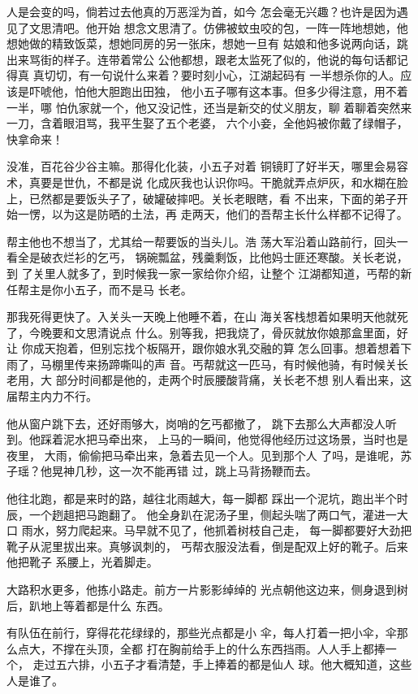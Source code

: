 人是会变的吗，倘若过去他真的万恶淫为首，如今
怎会毫无兴趣？也许是因为遇见了文思清吧。他开始
想念文思清了。仿佛被蚊虫咬的包，一阵一阵地想她，他
想她做的精致饭菜，想她同房的另一张床，想她一旦有
姑娘和他多说两向话，跳出来骂街的样子。连带着常公
公他都想，跟老太监死了似的，他说的每句话都记得真
真切切，有一句说什么来着？要时刻小心，江湖起码有
一半想杀你的人。应该是吓唬他，怕他大胆跑出田独，
他小五子哪有这本事。但多少得注意，用不着一半，哪
怕仇家就一个，他又没记性，还当是新交的仗义朋友，聊
着聊着突然来一刀，含着眼泪骂，我平生娶了五个老婆，
六个小妾，全他妈被你戴了绿帽子，快拿命来！

没准，百花谷少谷主嘛。那得化化装，小五子对着
铜镜盯了好半天，哪里会易容术，真要是世仇，不都是说
化成灰我也认识你吗。干脆就弄点炉灰，和水糊在脸
上，已然都是要饭头子了，破罐破摔吧。关长老眼瞎，看
不出来，下面的弟子开始一愣，以为这是防晒的土法，再
走两天，他们的吾帮主长什么样都不记得了。

帮主他也不想当了，尤其给一帮要饭的当头儿。浩
荡大军沿着山路前行，回头一看全是破衣烂衫的乞丐，
锅碗瓢盆，残羹剩饭，比他妈士匪还寒酸。关长老说，到
了关里人就多了，到时候我一家一家给你介绍，让整个
江湖都知道，丐帮的新任帮主是你小五子，而不是马
长老。

那我死得更快了。入关头一天晚上他睡不着，在山
海关客栈想着如果明天他就死了，今晚要和文思清说点
什么。别等我，把我烧了，骨灰就放你娘那盒里面，好让
你成天抱着，但别忘找个板隔开，跟你娘水乳交融的算
怎么回事。想着想着下雨了，马棚里传来扬蹄嘶叫的声
音。丐帮就这一匹马，有时候他骑，有时候关长老用，大
部分时间都是他的，走两个时辰腰酸背痛，关长老不想
别人看出来，这届帮主内力不行。

他从窗户跳下去，还好雨够大，岗哨的乞丐都撤了，
跳下去那么大声都没人听到。他踩着泥水把马牵出來，
上马的一瞬间，他觉得他经历过这场景，当时也是夜里，
大雨，偷偷把马牵出来，急着去见一个人。见到那个人
了吗，是谁呢，苏子瑶？他晃神几秒，这一次不能再错
过，跳上马背扬鞭而去。

他往北跑，都是来时的路，越往北雨越大，每一脚都
踩出一个泥坑，跑出半个时辰，一个趔趄把马跑翻了。
他全身趴在泥汤子里，侧起头喘了两口气，灌进一大口
雨水，努力爬起来。马早就不见了，他抓着树枝自己走，
每一脚都要好大劲把靴子从泥里拔出来。真够讽刺的，
丐帮衣服没法看，倒是配双上好的靴子。后来他把靴子
系腰上，光着脚走。

大路积水更多，他拣小路走。前方一片影影绰绰的
光点朝他这边来，侧身退到树后，趴地上等着都是什么
东西。

有队伍在前行，穿得花花绿绿的，那些光点都是小
伞，每人打着一把小伞，伞那么点大，不撑在头顶，全都
打在胸前给手上的什么东西挡雨。人人手上都捧一个，
走过五六排，小五子才看清楚，手上捧着的都是仙人
球。他大概知道，这些人是谁了。

